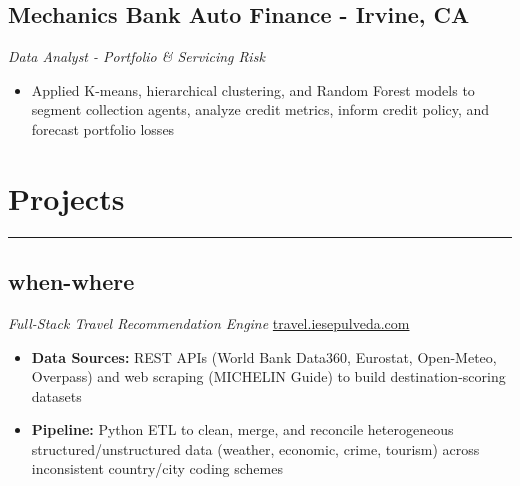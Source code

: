 \documentclass[11pt,a4paper]{article}
\newenvironment{myitemize}
{ \begin{itemize}[label={--}, leftmargin=*]
		\setlength{\itemsep}{0pt}
		\setlength{\parskip}{0pt}
		\setlength{\parsep}{0pt}     }
	{ \end{itemize}                  }
\begin{document}
	\subsection*{Mechanics Bank Auto Finance - Irvine, CA \hfill
					\vspace{-1mm} %
		  }
	\vspace{-1.5mm} %
	\textit{Data Analyst - Portfolio \& Servicing Risk}
	\vspace{-2.5mm} %
	\begin{myitemize}
		\item Applied K-means, hierarchical clustering, and Random Forest models to segment collection agents, analyze credit metrics, inform credit policy, and forecast portfolio losses
	\end{myitemize}
		\vspace{-8mm} %

	\section*{Projects}
	\vspace{-4mm} %
	\hrule
	\vspace{3mm} %

	\subsection*{when-where \hfill {}}
	\vspace{-1.5mm}
	\textit{Full-Stack Travel Recommendation Engine} \hfill \href{https://travel.iesepulveda.com}{travel.iesepulveda.com}
	\vspace{-2.5mm}
	\begin{myitemize}
\item \textbf{Data Sources:} REST APIs (World Bank Data360, Eurostat, Open-Meteo, Overpass) and web scraping (MICHELIN Guide) to build destination-scoring datasets
\item \textbf{Pipeline:} Python ETL to clean, merge, and reconcile heterogeneous structured/unstructured data (weather, economic, crime, tourism) across inconsistent country/city coding schemes
	\end{myitemize}
		\vspace{-6mm} %
\end{document}
